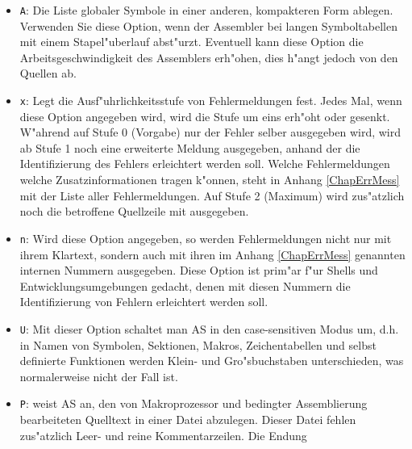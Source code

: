 \documentclass[12pt,a4paper,twoside]{report}
\newcommand{\bb}[1]{{\bf #1}}
\newcommand{\tty}[1]{{\tt #1}}
\newcommand{\asname}{AS}
\begin{document}
\begin{itemize}
{      oder interne Funktionen beinhalten, jedoch \bb{KEINE} anderen
      Symbole, selbst wenn diese schon davor in der Liste definiert
      sein sollten!  Zusammen mit den Befehlen zur bedingten
      Assemblierung (siehe dort) k"onnen so per Kommandozeile aus einer
      Quelldatei unterschiedliche Programmversionen erzeugt werden.
      {\bf ACHTUNG!} Wenn case-sensitiv gearbeitet werden soll, mu"s dies
      in der Kommandozeile {\em vor} Symboldefinitionen angegeben werden,
      sonst werden Symbolnamen schon an dieser Stelle in Gro"sbuchstaben
      umgewandelt!}
\item{\tty{A}: Die Liste globaler Symbole in einer anderen, kompakteren Form
      ablegen.  Verwenden Sie diese Option, wenn der Assembler bei
      langen Symboltabellen mit einem Stapel"uberlauf abst"urzt.
      Eventuell kann diese Option die Arbeitsgeschwindigkeit des
      Assemblers erh"ohen, dies h"angt jedoch von den Quellen ab.}
\item{\tty{x}: Legt die Ausf"uhrlichkeitsstufe von Fehlermeldungen fest.
      Jedes Mal, wenn diese Option angegeben wird, wird die Stufe
      um eins erh"oht oder gesenkt.  W"ahrend auf Stufe 0 (Vorgabe) nur
      der Fehler selber ausgegeben wird, wird ab Stufe 1 noch eine
      erweiterte Meldung ausgegeben, anhand der die Identifizierung des
      Fehlers erleichtert werden soll.  Welche Fehlermeldungen welche
      Zusatzinformationen tragen k"onnen, steht in Anhang \ref{ChapErrMess}
      mit der Liste aller Fehlermeldungen.  Auf Stufe 2 (Maximum) wird
      zus"atzlich noch die betroffene Quellzeile mit ausgegeben.}
\item{\tty{n}: Wird diese Option angegeben, so werden Fehlermeldungen nicht nur
      mit ihrem Klartext, sondern auch mit ihren im Anhang
      \ref{ChapErrMess} genannten internen Nummern ausgegeben.  Diese
      Option ist prim"ar f"ur Shells und Entwicklungsumgebungen gedacht,
      denen mit diesen Nummern die Identifizierung von Fehlern erleichtert
      werden soll.}
\item{\tty{U}: Mit dieser Option schaltet man \asname{} in den case-sensitiven
      Modus um, d.h. in Namen von Symbolen, Sektionen, Makros,
      Zeichentabellen und selbst definierte Funktionen werden Klein-
      und Gro"sbuchstaben unterschieden, was normalerweise nicht der
      Fall ist.}
\item{\tty{P}: weist \asname{} an, den von Makroprozessor und bedingter Assemblierung
      bearbeiteten Quelltext in einer Datei abzulegen.  Dieser Datei
      fehlen zus"atzlich Leer- und reine Kommentarzeilen.  Die Endung
}
\end{itemize}
\end{document}
